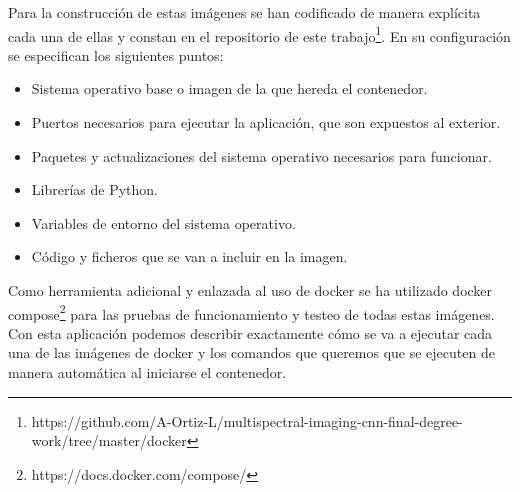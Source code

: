 Para la construcción de estas imágenes se han codificado de manera explícita cada una de ellas y constan en el repositorio de este trabajo\footnote{https://github.com/A-Ortiz-L/multispectral-imaging-cnn-final-degree-work/tree/master/docker}. En su configuración se especifican los siguientes puntos:
\begin{itemize}
    \item Sistema operativo base o imagen de la que hereda el contenedor.
    \item Puertos necesarios para ejecutar la aplicación, que son expuestos al exterior.
    \item Paquetes y actualizaciones del sistema operativo necesarios para funcionar.
    \item Librerías de Python.
    \item Variables de entorno del sistema operativo.
    \item Código y ficheros que se van a incluir en la imagen.
\end{itemize}

Como herramienta adicional y enlazada al uso de docker se ha utilizado docker compose\footnote{https://docs.docker.com/compose/} para las pruebas de funcionamiento y testeo de todas estas imágenes.
Con esta aplicación podemos describir exactamente cómo se va a ejecutar cada una de las imágenes de docker y los comandos que queremos que se ejecuten de manera automática al iniciarse el contenedor.